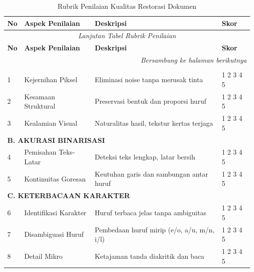 \vspace{1em}


\begin{longtable}{|p{0.5cm}|p{3.5cm}|p{7cm}|p{1.5cm}|}
\caption{Rubrik Penilaian Kualitas Restorasi Dokumen} \\
\hline
\textbf{No} & \textbf{Aspek Penilaian} & \textbf{Deskripsi} & \textbf{Skor} \\
\hline
\endfirsthead

\multicolumn{4}{c}{\textit{Lanjutan Tabel Rubrik Penilaian}} \\
\hline
\textbf{No} & \textbf{Aspek Penilaian} & \textbf{Deskripsi} & \textbf{Skor} \\
\hline
\endhead

\hline
\multicolumn{4}{r}{\textit{Bersambung ke halaman berikutnya}} \\
\endfoot

\hline
\endlastfoot


\multicolumn{4}{|l|}{\textbf{A. KUALITAS VISUAL}} \\
\hline
1 & Kejernihan Piksel & Eliminasi noise tanpa merusak tinta & 1 2 3 4 5 \\
\hline
2 & Kesamaan Struktural & Preservasi bentuk dan proporsi huruf & 1 2 3 4 5 \\
\hline
3 & Kealamian Visual & Naturalitas hasil, tekstur kertas terjaga & 1 2 3 4 5 \\
\hline

\multicolumn{4}{|l|}{\textbf{B. AKURASI BINARISASI}} \\
\hline
4 & Pemisahan Teks-Latar & Deteksi teks lengkap, latar bersih & 1 2 3 4 5 \\
\hline
5 & Kontinuitas Goresan & Keutuhan garis dan sambungan antar huruf & 1 2 3 4 5 \\
\hline

\multicolumn{4}{|l|}{\textbf{C. KETERBACAAN KARAKTER}} \\
\hline
6 & Identifikasi Karakter & Huruf terbaca jelas tanpa ambiguitas & 1 2 3 4 5 \\
\hline
7 & Disambiguasi Huruf & Pembedaan huruf mirip (e/o, a/u, m/n, i/l) & 1 2 3 4 5 \\
\hline
8 & Detail Mikro & Ketajaman tanda diakritik dan baca & 1 2 3 4 5 \\
\hline


\end{longtable}
